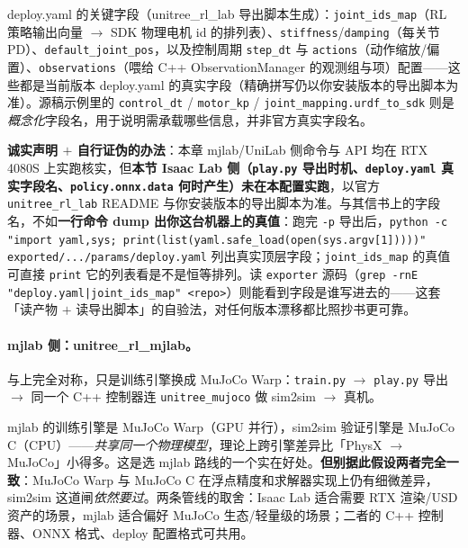 deploy.yaml 的关键字段（unitree\_rl\_lab 导出脚本生成）：\texttt{joint\_ids\_map}（RL 策略输出向量 $\to$ SDK 物理电机 id 的排列表）、\texttt{stiffness}/\texttt{damping}（每关节 PD）、\texttt{default\_joint\_pos}，以及控制周期 \texttt{step\_dt} 与 \texttt{actions}（动作缩放/偏置）、\texttt{observations}（喂给 C++ ObservationManager 的观测组与项）配置——这些都是当前版本 deploy.yaml 的真实字段（精确拼写仍以你安装版本的导出脚本为准）。源稿示例里的 \texttt{control\_dt} / \texttt{motor\_kp} / \texttt{joint\_mapping.urdf\_to\_sdk} 则是\emph{概念化}字段名，用于说明需承载哪些信息，并非官方真实字段名。

\begin{finenote}
\textbf{诚实声明 $+$ 自行证伪的办法}：本章 mjlab/UniLab 侧命令与 API 均在 RTX 4080S 上实跑核实，但\textbf{本节 Isaac Lab 侧（\texttt{play.py} 导出时机、\texttt{deploy.yaml} 真实字段名、\texttt{policy.onnx.data} 何时产生）未在本配置实跑}，以官方 \verb|unitree_rl_lab| README 与你安装版本的导出脚本为准。与其信书上的字段名，不如\textbf{一行命令 dump 出你这台机器上的真值}：跑完 \verb|-p| 导出后，\verb|python -c "import yaml,sys; print(list(yaml.safe_load(open(sys.argv[1]))))" exported/.../params/deploy.yaml| 列出真实顶层字段；\verb|joint_ids_map| 的真值可直接 \verb|print| 它的列表看是不是恒等排列。读 \verb|exporter| 源码（\verb=grep -rnE "deploy.yaml|joint_ids_map" <repo>=）则能看到字段是谁写进去的——这套「读产物 $+$ 读导出脚本」的自验法，对任何版本漂移都比照抄书更可靠。
\end{finenote}

\paragraph{mjlab 侧：unitree\_rl\_mjlab。}与上完全对称，只是训练引擎换成 MuJoCo Warp\cite{unitree_rl_mjlab}：\verb|train.py| $\to$ \verb|play.py| 导出 $\to$ 同一个 C++ 控制器连 \verb|unitree_mujoco| 做 sim2sim $\to$ 真机。

\begin{insight}\label{ins:rlmc-s2r-warp}
mjlab 的训练引擎是 MuJoCo Warp（GPU 并行），sim2sim 验证引擎是 MuJoCo C（CPU）——\emph{共享同一个物理模型}，理论上跨引擎差异比「PhysX $\to$ MuJoCo」小得多。这是选 mjlab 路线的一个实在好处。\textbf{但别据此假设两者完全一致}：MuJoCo Warp 与 MuJoCo C 在浮点精度和求解器实现上仍有细微差异，sim2sim 这道闸\emph{依然要过}。两条管线的取舍：Isaac Lab 适合需要 RTX 渲染/USD 资产的场景，mjlab 适合偏好 MuJoCo 生态/轻量级的场景；二者的 C++ 控制器、ONNX 格式、deploy 配置格式可共用。
\end{insight}

